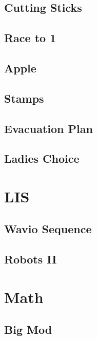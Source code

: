         \subsection{Cutting Sticks}
                
        \subsection{Race to 1}
                
        \subsection{Apple}
                
        \subsection{Stamps}
                
        \subsection{Evacuation Plan}
                
        \subsection{Ladies Choice}
                

\section{LIS}
        \subsection{Wavio Sequence}
                
        \subsection{Robots II}
                

\section{Math}
        \subsection{Big Mod}
                
